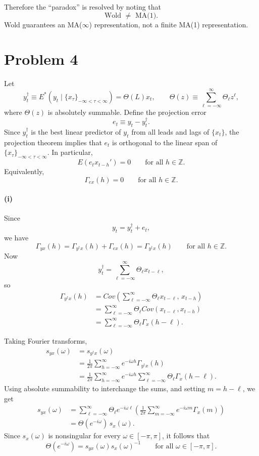 \documentclass[11pt]{article}
\begin{document}
Therefore the ``paradox'' is resolved by noting that
\[
{\text{Wold } \neq \text{ MA(1)}.}
\]
Wold guarantees an MA(\(\infty\)) representation, not a finite MA(1) representation.


\section{Problem 4}

Let
\[
y_t^\dagger \equiv E^*(y_t \mid \{x_\tau\}_{-\infty<\tau<\infty})=\Theta(L)x_t,
\qquad
\Theta(z)\equiv \sum_{\ell=-\infty}^{\infty}\Theta_\ell z^\ell,
\]
where \(\Theta(z)\) is absolutely summable. Define the projection error
\[
e_t \equiv y_t-y_t^\dagger.
\]
Since \(y_t^\dagger\) is the best linear predictor of \(y_t\) from all leads and lags of \(\{x_t\}\), the projection theorem implies that \(e_t\) is orthogonal to the linear span of \(\{x_\tau\}_{-\infty<\tau<\infty}\). In particular,
\[
E(e_t x_{t-h}')=0 \qquad \text{for all } h\in\mathbb Z.
\]
Equivalently,
\[
\Gamma_{ex}(h)=0 \qquad \text{for all } h\in\mathbb Z.
\]

\paragraph{(i)}
Since
\[
y_t = y_t^\dagger + e_t,
\]
we have
\[
\Gamma_{yx}(h)=\Gamma_{y^\dagger x}(h)+\Gamma_{ex}(h)=\Gamma_{y^\dagger x}(h)
\qquad \text{for all } h\in\mathbb Z.
\]
Now
\[
y_t^\dagger=\sum_{\ell=-\infty}^{\infty}\Theta_\ell x_{t-\ell},
\]
so
\begin{align*}
\Gamma_{y^\dagger x}(h)
&= Cov\!\left(\sum_{\ell=-\infty}^{\infty}\Theta_\ell x_{t-\ell},\,x_{t-h}\right) \\
&= \sum_{\ell=-\infty}^{\infty}\Theta_\ell Cov(x_{t-\ell},x_{t-h}) \\
&= \sum_{\ell=-\infty}^{\infty}\Theta_\ell \Gamma_x(h-\ell).
\end{align*}

Taking Fourier transforms,
\begin{align*}
s_{yx}(\omega)
&= s_{y^\dagger x}(\omega) \\
&= \frac{1}{2\pi}\sum_{h=-\infty}^{\infty} e^{-i\omega h}\Gamma_{y^\dagger x}(h) \\
&= \frac{1}{2\pi}\sum_{h=-\infty}^{\infty} e^{-i\omega h}
\sum_{\ell=-\infty}^{\infty}\Theta_\ell \Gamma_x(h-\ell).
\end{align*}
Using absolute summability to interchange the sums, and setting \(m=h-\ell\), we get
\begin{align*}
s_{yx}(\omega)
&= \sum_{\ell=-\infty}^{\infty}\Theta_\ell e^{-i\omega \ell}
\left(\frac{1}{2\pi}\sum_{m=-\infty}^{\infty} e^{-i\omega m}\Gamma_x(m)\right) \\
&= \Theta(e^{-i\omega})\,s_x(\omega).
\end{align*}
Since \(s_x(\omega)\) is nonsingular for every \(\omega\in[-\pi,\pi]\), it follows that
\[
{\Theta(e^{-i\omega})=s_{yx}(\omega)s_x(\omega)^{-1}}
\qquad \text{for all } \omega\in[-\pi,\pi].
\]
\end{document}
